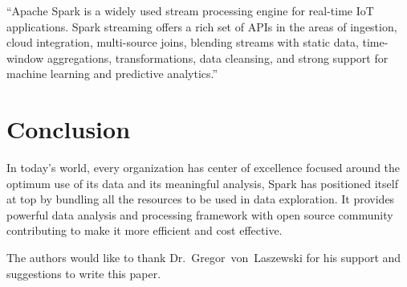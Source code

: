 ``Apache Spark is a widely used stream processing engine for real-time IoT applications. Spark streaming
offers a rich set of APIs in the areas of ingestion, cloud integration, multi-source joins, blending streams
with static data, time-window aggregations, transformations, data cleansing, and strong support for machine
learning and predictive analytics.''~\cite{hid-sp18-522-deepcore}


\section{Conclusion}

In today's world, every organization has center of excellence focused around the optimum use of its data and
its meaningful analysis, Spark has positioned itself at top by bundling all the resources to be used in data
exploration. It provides powerful data analysis and processing framework with open source community 
contributing to make it more efficient and cost effective. 


\begin{acks}

  The authors would like to thank Dr.~Gregor~von~Laszewski for his
  support and suggestions to write this paper.

\end{acks}



